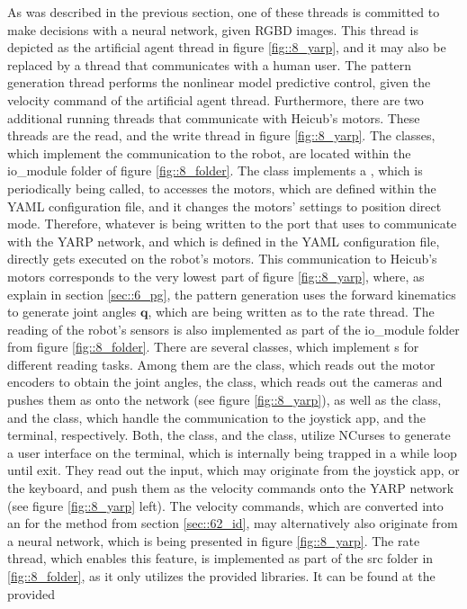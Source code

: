 As was described in the previous section, one of these threads is committed to make decisions with a neural network, given RGBD images. This thread is depicted as the artificial agent thread in figure \ref{fig::8_yarp}, and it may also be replaced by a thread that communicates with a human user. The pattern generation thread performs the nonlinear model predictive control, given the velocity command of the artificial agent thread. Furthermore, there are two additional running threads that communicate with Heicub's motors. These threads are the read, and the write thread in figure \ref{fig::8_yarp}. The classes, which implement the communication to the robot, are located within the io\_module folder of figure \ref{fig::8_folder}. The  class implements a , which is periodically being called, to accesses the motors, which are defined within the YAML configuration file, and it changes the motors' settings to position direct mode. Therefore, whatever is being written to the port that  uses to communicate with the YARP network, and which is defined in the YAML configuration file, directly gets executed on the robot's motors. This communication to Heicub's motors corresponds to the very lowest part of figure \ref{fig::8_yarp}, where, as explain in section \ref{sec::6_pg}, the pattern generation uses the forward kinematics to generate joint angles $\bm{q}$, which are being written as  to the  rate thread. The reading of the robot's sensors is also implemented as part of the io\_module folder from figure \ref{fig::8_folder}. There are several classes, which implement s for different reading tasks. Among them are the  class, which reads out the motor encoders to obtain the joint angles, the  class, which reads out the cameras and pushes them as  onto the network (see figure \ref{fig::8_yarp}), as well as the  class, and the  class, which handle the communication to the joystick app, and the terminal, respectively. Both, the  class, and the  class, utilize NCurses to generate a user interface on the terminal, which is internally being trapped in a while loop until exit. They read out the input, which may originate from the joystick app, or the keyboard, and push them as the velocity commands onto the YARP network (see figure \ref{fig::8_yarp} left). The velocity commands, which are converted into an  for the  method from section \ref{sec::62_id}, may alternatively also originate from a neural network, which is being presented in figure \ref{fig::8_yarp}. The  rate thread, which enables this feature, is implemented as part of the src folder in \ref{fig::8_folder}, as it only utilizes the provided libraries. It can be found at the provided 